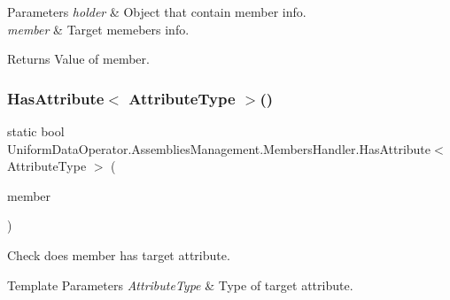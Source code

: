 \begin{DoxyParams}{Parameters}
{\em holder} & Object that contain member info.\\
\hline
{\em member} & Target memeber\textquotesingle{}s info.\\
\hline
\end{DoxyParams}
\begin{DoxyReturn}{Returns}
Value of member.
\end{DoxyReturn}
\mbox{\label{class_uniform_data_operator_1_1_assemblies_management_1_1_members_handler_a4b9cd91b2f9c5f8871e71ff70912ff8d}} 
\subsubsection{\texorpdfstring{Has\+Attribute$<$ Attribute\+Type $>$()}{HasAttribute< AttributeType >()}}
{\footnotesize\ttfamily static bool Uniform\+Data\+Operator.\+Assemblies\+Management.\+Members\+Handler.\+Has\+Attribute$<$ Attribute\+Type $>$ (\begin{DoxyParamCaption}\item[{Member\+Info}]{member }\end{DoxyParamCaption})\hspace{0.3cm}{\ttfamily [static]}}



Check does member has target attribute. 


\begin{DoxyTemplParams}{Template Parameters}
{\em Attribute\+Type} & Type of target attribute.\\
\hline
\end{DoxyTemplParams}

